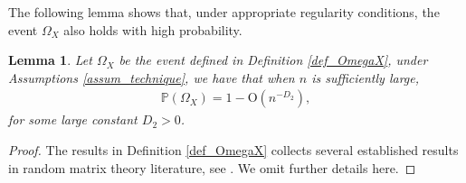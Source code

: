 \documentclass[12pt]{article}
\theoremstyle{plain}
\newtheorem{lemma}{Lemma}[section]
\numberwithin{equation}{section}
\begin{document}
The following lemma shows that, under appropriate regularity conditions, the event $\Omega_X$ also holds with high probability. 
\begin{lemma}\label{lem_probabilitycontrol_X}
	Let $\Omega_X$ be the event defined in Definition \ref{def_OmegaX}, under Assumptions \ref{assum_technique}, we have that when $n$ is sufficiently large,
	\begin{align*}
		\mathbb{P}(\Omega_X)=1-\mathrm{O}(n^{-D_2}),
	\end{align*}
	for some large constant $D_2>0$.
\end{lemma}
\begin{proof}
	The results in Definition \ref{def_OmegaX} collects several established results in random matrix theory literature, see \cite{Bao2015,Alex2014,ding2024eigenvector,Ding&Yang2018,knowles2013isotropic,knowles2017anisotropic}. We omit further details here.
\end{proof}
\end{document}
